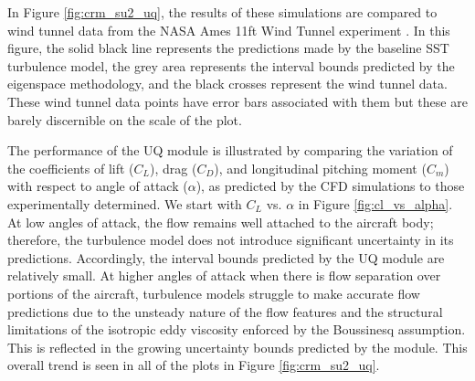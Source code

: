 In Figure \ref{fig:crm_su2_uq}, the results of these simulations are compared to wind tunnel data from the NASA Ames 11ft Wind Tunnel experiment \cite{rivers_experimental_2010}. In this figure, the solid black line represents the predictions made by the baseline SST turbulence model, the grey area represents the interval bounds predicted by the eigenspace methodology, and the black crosses represent the wind tunnel data. These wind tunnel data points have error bars associated with them but these are barely discernible on the scale of the plot. 

The performance of the UQ module is illustrated by comparing the variation of the coefficients of lift ($C_L$), drag ($C_D$), and longitudinal pitching moment ($C_m$) with respect to angle of attack ($\alpha$), as predicted by the CFD simulations to those experimentally determined. We start with $C_L$ vs. $\alpha$ in Figure \ref{fig:cl_vs_alpha}. At low angles of attack, the flow remains well attached to the aircraft body; therefore, the turbulence model does not introduce significant uncertainty in its predictions. Accordingly, the interval bounds predicted by the UQ module are relatively small. At higher angles of attack when there is flow separation over portions of the aircraft, turbulence models struggle to make accurate flow predictions due to the unsteady nature of the flow features and the structural limitations of the isotropic eddy viscosity enforced by the Boussinesq assumption. This is reflected in the growing uncertainty bounds predicted by the module. This overall trend is seen in all of the plots in Figure \ref{fig:crm_su2_uq}. 

